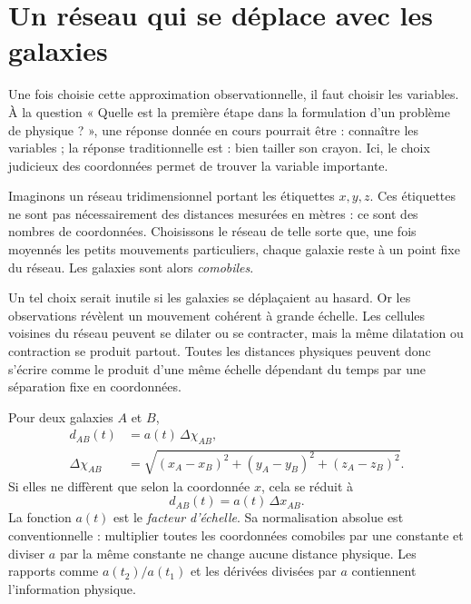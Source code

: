 \begin{classroomqa}
\end{classroomqa}

\section{Un réseau qui se déplace avec les galaxies}

Une fois choisie cette approximation observationnelle, il faut choisir les variables. À la question « Quelle est la première étape dans la formulation d’un problème de physique ? », une réponse donnée en cours pourrait être : connaître les variables ; la réponse traditionnelle est : bien tailler son crayon. Ici, le choix judicieux des coordonnées permet de trouver la variable importante.

Imaginons un réseau tridimensionnel portant les étiquettes \(x,y,z\). Ces étiquettes ne sont pas nécessairement des distances mesurées en mètres : ce sont des nombres de coordonnées. Choisissons le réseau de telle sorte que, une fois moyennés les petits mouvements particuliers, chaque galaxie reste à un point fixe du réseau. Les galaxies sont alors \emph{comobiles}.

Un tel choix serait inutile si les galaxies se déplaçaient au hasard. Or les observations révèlent un mouvement cohérent à grande échelle. Les cellules voisines du réseau peuvent se dilater ou se contracter, mais la même dilatation ou contraction se produit partout. Toutes les distances physiques peuvent donc s’écrire comme le produit d’une même échelle dépendant du temps par une séparation fixe en coordonnées.

Pour deux galaxies \(A\) et \(B\),
\begin{equation}
\begin{aligned}
d_{AB}(t)&=a(t)\,\Delta\chi_{AB},\\
\Delta\chi_{AB}
&=\sqrt{(x_A-x_B)^2+(y_A-y_B)^2+(z_A-z_B)^2}.
\end{aligned}
\label{eq:c01-physical-distance}
\end{equation}
Si elles ne diffèrent que selon la coordonnée \(x\), cela se réduit à
\begin{equation}
d_{AB}(t)=a(t)\,\Delta x_{AB}.
\end{equation}
La fonction \(a(t)\) est le \emph{facteur d’échelle}. Sa normalisation absolue est conventionnelle : multiplier toutes les coordonnées comobiles par une constante et diviser \(a\) par la même constante ne change aucune distance physique. Les rapports comme \(a(t_2)/a(t_1)\) et les dérivées divisées par \(a\) contiennent l’information physique.

